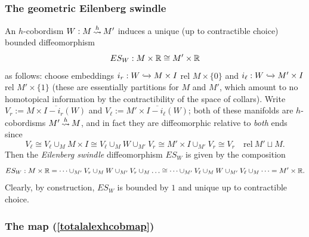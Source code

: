 \documentclass[a4paper, oneside]{amsart}
\newcommand{\hcob}{\hspace{2pt}\ensuremath \raisebox{-1pt}{$\overset{h}{\leadsto}$}\hspace{2pt}}
\newcommand{\1}{\mathds{1}}
\theoremstyle{remark}
\theoremstyle{definition}
\newcommand{\R}{{\scaleobj{0.97}{\mathbb{R}}}}
\numberwithin{equation}{section}
\begin{document}
\subsubsection{The geometric Eilenberg swindle} An $h$-cobordism $W: M\hcob M'$ induces a unique (up to contractible choice) bounded diffeomorphism
\begin{equation}\label{ES}
    ES_W: M\times \R\cong M'\times \R
\end{equation}
as follows: choose embeddings $i_r: W\xhookrightarrow{} M\times I$ rel $M\times \{0\}$ and $i_\ell: W\xhookrightarrow{}M'\times I$ rel $M'\times \{1\}$ (these are essentially partitions for $M$ and $M'$, which amount to no homotopical information by the contractibility of the space of collars). Write $V_r:= \overline{M\times I - i_r(W)}$ and $V_\ell:=\overline{M'\times I-i_\ell(W)}$; both of these manifolds are $h$-cobordisms $M'\hcob M$, and in fact they are diffeomorphic relative to \emph{both} ends since
$$
V_\ell\cong V_\ell\cup_{M} M\times I\cong V_\ell\cup_{M} W\cup_{M'}V_r\cong M'\times I\cup_{M'} V_r\cong V_r\quad \mathrm{rel}\ M'\sqcup M.
$$
Then the \textit{Eilenberg swindle} diffeomorphism $ES_W$ is given by the composition
\[
ES_W:M\times \R=\dots \cup_{M'}V_r\cup_M W\cup_{M'} V_r\cup_{M}\ensuremath{\dots}\cong\dots \cup_{M'}V_\ell\cup_M W\cup_{M'} V_\ell\cup_{M}\dots =M'\times \R.
\]
Clearly, by construction, $ES_W$ is bounded by $1$ and unique up to contractible choice.


\subsubsection{The map (\ref{totalalexhcobmap})}
\end{document}
